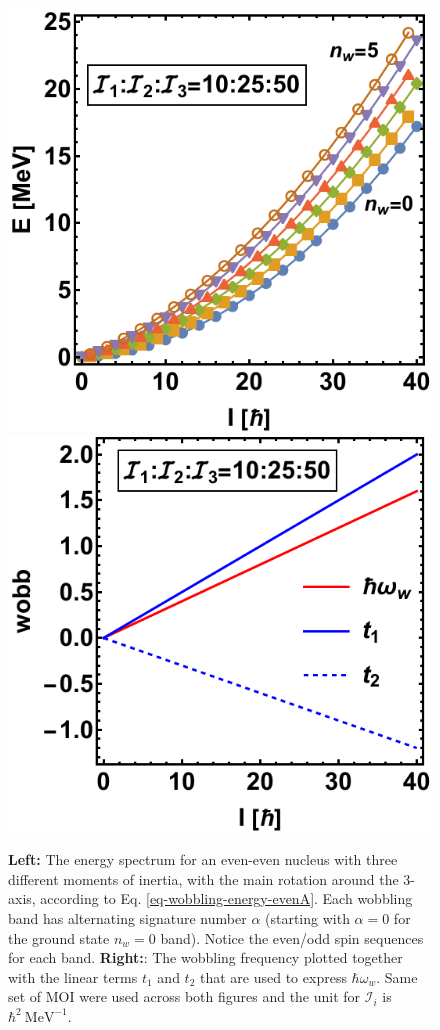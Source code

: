 \begin{figure}
    \centering
    \includegraphics[scale=0.7]{Chapters/Figures/wobbling-evenA.pdf}
    \includegraphics[scale=0.74]{Chapters/Figures/wobblingFreq-evenA.pdf}
    \caption{\textbf{Left:} The energy spectrum for an even-even nucleus with three different moments of inertia, with the main rotation around the $3$-axis, according to Eq. \ref{eq-wobbling-energy-evenA}. Each wobbling band has alternating signature number $\alpha$ (starting with $\alpha=0$ for the ground state $n_w=0$ band). Notice the even/odd spin sequences for each band. \textbf{Right:}: The wobbling frequency plotted together with the linear terms $t_1$ and $t_2$ that are used to express $\hbar\omega_w$. Same set of MOI were used across both figures and the unit for $\mathcal{I}_i$ is $\hbar^2\ \text{MeV}^{-1}$.}
    \label{fig-even-even-wobbling-energies}
\end{figure}


